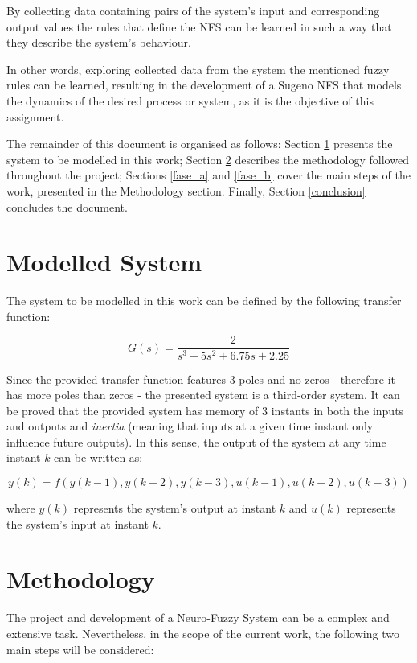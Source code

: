 \documentclass[11pt]{article}
\begin{document}
By collecting data containing pairs of the system's input and corresponding output values the rules that define the NFS can be learned in such a way that they describe the system's behaviour.

In other words, exploring collected data from the system the mentioned fuzzy rules can be learned, resulting in the development of a Sugeno NFS that models the dynamics of the desired process or system, as it is the objective of this assignment.

The remainder of this document is organised as follows: Section \ref{modelled_system} presents the system to be modelled in this work; Section \ref{methodology} describes the methodology followed throughout the project; Sections \ref{fase_a} and \ref{fase_b} cover the main steps of the work, presented in the Methodology section. Finally, Section \ref{conclusion} concludes the document.


\section{Modelled System}
\label{modelled_system}

The system to be modelled in this work can be defined by the following transfer function:

$$ G(s) = \frac{2}{s^{3} + 5s^{2} + 6.75s + 2.25}$$

Since the provided transfer function features $3$ poles and no zeros - therefore it has more poles than zeros - the presented system is a third-order system. It can be proved that the provided system has memory of $3$ instants in both the inputs and outputs and \emph{inertia} (meaning that inputs at a given time instant only influence future outputs). In this sense, the output of the system at any time instant $k$ can be written as:

$$ y(k) = f(y(k-1), y(k-2), y(k-3), u(k-1), u(k-2),u(k-3))$$

where $y(k)$ represents the system's output at instant $k$ and $u(k)$ represents the system's input at instant $k$.

\section{Methodology}
\label{methodology}

The project and development of a Neuro-Fuzzy System can be a complex and extensive task. Nevertheless, in the scope of the current work, the following two main steps will be considered:
\end{document}
